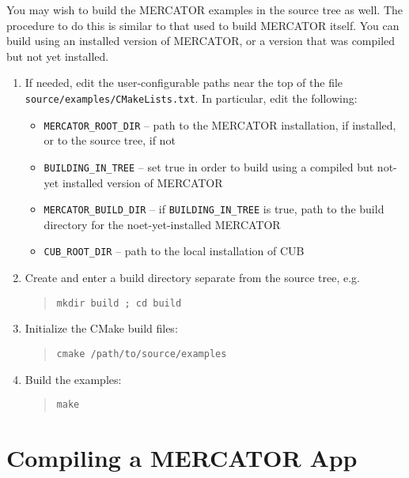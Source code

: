 \documentclass[11pt]{article}
\begin{document}
You may wish to build the MERCATOR examples in the source tree as
well.  The procedure to do this is similar to that used to build
MERCATOR itself.  You can build using an installed version of
MERCATOR, or a version that was compiled but not yet installed.
\begin{enumerate}

\item If needed, edit the user-configurable paths near the top of the
  file \texttt{source/examples/CMakeLists.txt}.  In particular, edit
  the following:

 \begin{itemize}
   \item \texttt{MERCATOR_ROOT_DIR} -- path to the MERCATOR installation,
      if installed, or to the source tree, if not

   \item \texttt{BUILDING_IN_TREE} -- 
      set true in order to build using a compiled but not-yet installed
      version of MERCATOR

   \item \texttt{MERCATOR_BUILD_DIR} --
      if \texttt{BUILDING_IN_TREE} is true, path to the build directory
      for the noet-yet-installed MERCATOR

   \item \texttt{CUB_ROOT_DIR} -- path to the local installation of CUB
 \end{itemize}

\item Create and enter a build directory separate from the source tree, e.g.
\begin{quote}
\texttt{mkdir build ; cd build}
\end{quote}

\item Initialize the CMake build files:
\begin{quote}
\texttt{cmake /path/to/source/examples}
\end{quote}

\item Build the examples:
\begin{quote}
\texttt{make}
\end{quote}

\end{enumerate}

\section{Compiling a MERCATOR App}
\end{document}

